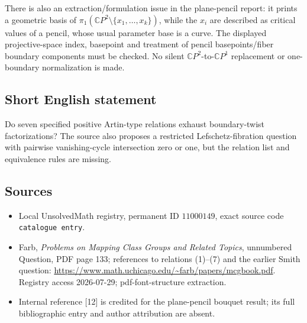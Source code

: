 \documentclass[11pt]{article}
\begin{document}
There is also an extraction/formulation issue in the plane-pencil report: it prints a geometric basis of \(\pi_1(\mathbb CP^2\setminus\{x_1,\ldots,x_k\})\), while the \(x_i\) are described as critical values of a pencil, whose usual parameter base is a curve. The displayed projective-space index, basepoint and treatment of pencil basepoints/fiber boundary components must be checked. No silent \(\mathbb CP^2\)-to-\(\mathbb CP^1\) replacement or one-boundary normalization is made.
\subsection{Short English statement}
Do seven specified positive Artin-type relations exhaust boundary-twist factorizations? The source also proposes a restricted Lefschetz-fibration question with pairwise vanishing-cycle intersection zero or one, but the relation list and equivalence rules are missing.
\subsection{Sources}
\begin{itemize}
\item Local UnsolvedMath registry, permanent ID \(11000149\), exact source code \texttt{catalogue entry}.
\item Farb, \emph{Problems on Mapping Class Groups and Related Topics}, unnumbered Question, PDF page 133; references to relations (1)--(7) and the earlier Smith question: \url{https://www.math.uchicago.edu/~farb/papers/mcgbook.pdf}. Registry access 2026-07-29; pdf-font-structure extraction.
\item Internal reference [12] is credited for the plane-pencil bouquet result; its full bibliographic entry and author attribution are absent.
\end{itemize}
\end{document}

